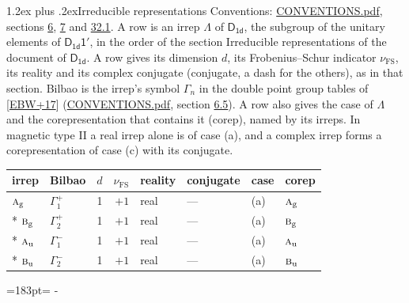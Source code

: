 \documentclass[10pt,a4paper]{article}
\makeatletter
\renewcommand\section{\@startsection{section}{1}{\z@}{-3ex plus -1ex minus -.2ex}%
  {1.2ex plus .2ex}{\normalfont\large\sffamily\bfseries\color{parttitle}}}
\newcommand{\needspace}[1]{\par\penalty-100\begingroup\dimen0=#1\relax\dimen2=\pagegoal
  \advance\dimen2-\pagetotal\ifdim\dimen0>\dimen2\relax\ifdim\dimen2>0pt\vfil\break\fi\fi
  \endgroup}
\numberwithin{equation}{section}
\newcommand{\grp}[1]{\mathsf{#1}}
\newcommand{\irr}[1]{\text{\normalfont\scshape #1}}
\newcommand{\ptag}[1]{\mathrm{#1}}
\newcommand{\fsind}{\nu_{\mathrm{FS}}}
\makeatother
\begin{document}
\section{Irreducible representations}\label{s:irreps}
Conventions: \href{../../CONVENTIONS.pdf}{CONVENTIONS.pdf}, sections \href{../../../rotation/CONVENTIONS.pdf\#conv.6}{6}, \href{../../../rotation/CONVENTIONS.pdf\#conv.7}{7} and \href{../../CONVENTIONS.pdf\#conv.32.1}{32.1}.
\leavevmode\label{n:irrep.Delta}A row is an irrep $\Lambda$ of $\grp{D_{1d}}$, the subgroup of the unitary elements of $\grp{D_{1d}1'}$, in the order of the section Irreducible representations of the document of \href{../../../rotation/data/pdf/D1d.pdf}{$\grp{D_{1d}}$}. \label{n:index.dimension}\label{n:index.frobenius}\label{n:head.irrep}\label{n:head.reality}\label{n:head.conjugate}A row gives its dimension $d$, its Frobenius--Schur indicator $\fsind$, its reality and its complex conjugate (conjugate, a dash for the others), as in that section. \label{n:head.bilbao}\label{n:irrep.alias.gamma}Bilbao is the irrep's symbol $\Gamma_n$ in the double point group tables of [\href{../../../REFERENCES.pdf\#ref.EBW+17}{EBW+17}] (\href{../../CONVENTIONS.pdf}{CONVENTIONS.pdf}, section \href{../../../rotation/CONVENTIONS.pdf\#conv.6.5}{6.5}). \label{n:head.case.corep}\label{n:head.corep}A row also gives the case of $\Lambda$ and the corepresentation that contains it (corep), named by its irreps. In magnetic type II a real irrep alone is of case (a), and a complex irrep forms a corepresentation of case (c) with its conjugate.
\setlength{\emergencystretch}{2em}\par\setlength{\emergencystretch}{0pt}
{\small\renewcommand{\arraystretch}{1.25}\setlength{\tabcolsep}{4pt}\begin{longtable}{@{}llrrllll@{}}\toprule
irrep & Bilbao & $d$ & $\fsind$ & reality & conjugate & case & corep\\\midrule\endhead
\bottomrule\endfoot\endlastfoot
$\irr{a}_{\ptag{g}}$ & $\Gamma_{1}^{+}$ & 1 & $+1$ & real & --- & (a) & $\irr{a}_{\ptag{g}}$\\*
$\irr{b}_{\ptag{g}}$ & $\Gamma_{2}^{+}$ & 1 & $+1$ & real & --- & (a) & $\irr{b}_{\ptag{g}}$\\*
$\irr{a}_{\ptag{u}}$ & $\Gamma_{1}^{-}$ & 1 & $+1$ & real & --- & (a) & $\irr{a}_{\ptag{u}}$\\*
$\irr{b}_{\ptag{u}}$ & $\Gamma_{2}^{-}$ & 1 & $+1$ & real & --- & (a) & $\irr{b}_{\ptag{u}}$\\
\bottomrule\end{longtable}}
\needspace{183pt}
\end{document}
